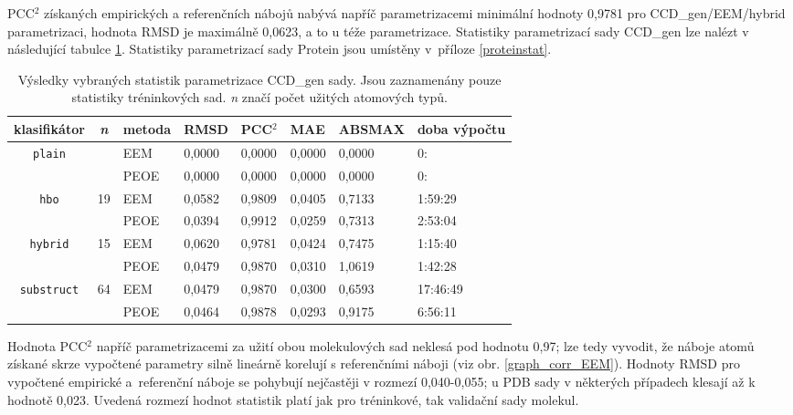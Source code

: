 PCC$^2$ získaných empirických a referenčních nábojů nabývá napříč parametrizacemi minimální hodnoty 0,9781 pro CCD\_gen/EEM/hybrid parametrizaci, hodnota RMSD je maximálně 0,0623, a to u téže parametrizace. Statistiky parametrizací sady CCD\_gen lze nalézt v následující tabulce \ref{statistics}. Statistiky parametrizací sady Protein jsou umístěny v~příloze \ref{proteinstat}. 
\medskip
\begin{table}[h]
    \small
    \renewcommand{\arraystretch}{1.4}
    \centering
    \begin{tabular}{c|c|l|l|l|l|l|l}
         \textbf{klasifikátor} & \textit{n} & \textbf{metoda} & \textbf{RMSD} & \textbf{PCC$^2$} & \textbf{MAE} & \textbf{ABSMAX} & \textbf{doba výpočtu}\\
         \hline
         \multirow{2}{6em}{\texttt{plain}} & \multirow{2}{1.5em}{} & EEM & 0,0000 & 0,0000 & 0,0000 & 0,0000 & 0: \\
         & & PEOE & 0,0000 & 0,0000 & 0,0000 & 0,0000 & 0: \\
         \hline
         \multirow{2}{6em}{\texttt{hbo}} & \multirow{2}{1.5em}{19} & EEM & 0,0582 & 0,9809 & 0,0405 & 0,7133 & 1:59:29  \\
         & & PEOE & 0,0394 & 0,9912 & 0,0259 & 0,7313 & 2:53:04 \\
         \hline
         \multirow{2}{6em}{\texttt{hybrid}} & \multirow{2}{1.5em}{15} & EEM & 0,0620 & 0,9781 & 0,0424 & 0,7475 & 1:15:40 \\
         & & PEOE & 0,0479 & 0,9870 & 0,0310 & 1,0619 & 1:42:28 \\
         \hline
         \multirow{2}{6em}{\texttt{substruct}} & \multirow{2}{1.5em}{64} & EEM & 0,0479 & 0,9870 & 0,0300 & 0,6593 & 17:46:49 \\
         & & PEOE & 0,0464 & 0,9878 & 0,0293 & 0,9175 & 6:56:11 
    \end{tabular}
    \caption{Výsledky vybraných statistik parametrizace CCD\_gen sady. Jsou zaznamenány pouze statistiky tréninkových sad. \textit{n} značí počet užitých atomových typů.}
    \label{statistics}
\end{table}
\medskip

Hodnota PCC$^2$ napříč parametrizacemi za užití obou molekulových sad neklesá pod hodnotu 0,97; lze tedy vyvodit, že náboje atomů získané skrze vypočtené parametry silně lineárně korelují s referenčními náboji (viz obr. \ref{graph_corr_EEM}). Hodnoty RMSD pro vypočtené empirické a~referenční náboje se pohybují nejčastěji v rozmezí 0,040-0,055; u PDB sady v některých případech klesají až k hodnotě 0,023. Uvedená rozmezí hodnot statistik platí jak pro tréninkové, tak validační sady molekul. 

